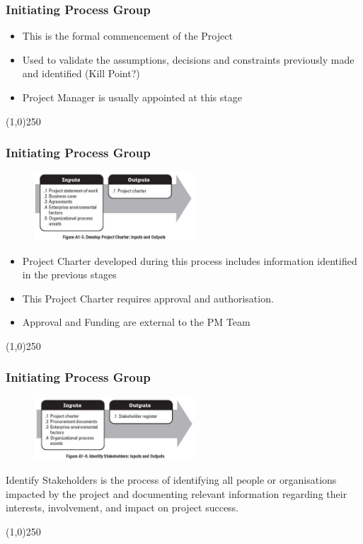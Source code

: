 \begin{frame}
\frametitle{Initiating Process Group}
\begin{itemize}
	\item This is the formal commencement of the Project
	\item Used to validate the assumptions, decisions and constraints previously made and identified (Kill Point?)
	\item Project Manager is usually appointed at this stage
\end{itemize}
\end{frame}
\begin{center}\line(1,0){250}\end{center}



\begin{frame}
\frametitle{Initiating Process Group}
\begin{figure}
	\centering
		\includegraphics[width = 6cm]{images/FigA1-5.jpg}
	\label{fig:A1-5}
\end{figure} 
\begin{itemize}
	\item Project Charter developed during this process includes information identified in the previous stages
	\item This Project Charter requires approval and authorisation.
	\item Approval and Funding are external to the PM Team
\end{itemize}
\end{frame}
\begin{center}\line(1,0){250}\end{center}



\begin{frame}
\frametitle{Initiating Process Group}
\begin{figure}
	\centering
		\includegraphics[width = 6cm]{images/FigA1-6.jpg}
	\label{fig:A1-6}
\end{figure} 
Identify Stakeholders is the process of identifying all people or organisations impacted by the project and documenting relevant information regarding their interests, involvement, and impact on project success.
\end{frame}
\begin{center}\line(1,0){250}\end{center}



